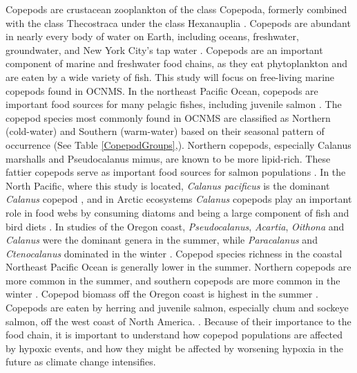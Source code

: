 \documentclass[12pt,twoside]{reedthesis}
\begin{document}
Copepods are crustacean zooplankton of the class Copepoda, formerly combined with the class Thecostraca under the class Hexanauplia \autocite{Oakley2013, Lozano-Fernandez2019}. Copepods are abundant in nearly every body of water on Earth, including oceans, freshwater, groundwater, and New York City's tap water \autocite{Vakati2023, Berger2004}. Copepods are an important component of marine and freshwater food chains, as they eat phytoplankton and are eaten by a wide variety of fish. This study will focus on free-living marine copepods found in OCNMS. In the northeast Pacific Ocean, copepods are important food sources for many pelagic fishes, including juvenile salmon \autocite{Brodeur1990}. The copepod species most commonly found in OCNMS are classified as Northern (cold-water) and Southern (warm-water) based on their seasonal pattern of occurrence (See Table \ref{CopepodGroups},\autocite{NOAAFisheries2024, Peterson2003, Peterson1977}).  Northern copepods, especially Calanus marshalls and Pseudocalanus mimus, are known to be more lipid-rich. These fattier copepods serve as important food sources for salmon populations \autocite{NOAAFisheries2024}. In the North Pacific, where this study is located, \textit{Calanus pacificus} is the dominant \textit{Calanus} copepod \autocite{Star1981}, and in Arctic ecosystems \textit{Calanus} copepods play an important role in food webs by consuming diatoms and being a large component of fish and bird diets \autocite{Falk-Petersen2007}. In studies of the Oregon coast, \textit{Pseudocalanus}, \textit{Acartia}, \textit{Oithona} and \textit{Calanus} were the dominant genera in the summer, while \textit{Paracalanus} and \textit{Ctenocalanus} dominated in the winter \autocite{Peterson1977, Peterson2003}. Copepod species richness in the coastal Northeast Pacific Ocean is generally lower in the summer. Northern copepods are more common in the summer, and southern copepods are more common in the winter \autocite{NOAAFisheries2024}. Copepod biomass off the Oregon coast is highest in the summer \autocite{Peterson2003}. Copepods are eaten by herring and juvenile salmon, especially chum and sockeye salmon, off the west coast of North America. \autocite{Brodeur1990, Friedenberg2012}. Because of their importance to the food chain, it is important to understand how copepod populations are affected by hypoxic events, and how they might be affected by worsening hypoxia in the future as climate change intensifies. 
\end{document}
